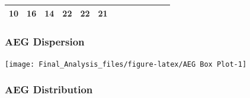 \begin{longtable}[]{@{}lcccccccccccc@{}}
\begin{minipage}[t]{0.04\columnwidth}
10\strut
\end{minipage} & \begin{minipage}[t]{0.04\columnwidth}\centering\strut
16\strut
\end{minipage} & \begin{minipage}[t]{0.04\columnwidth}\centering\strut
14\strut
\end{minipage} & \begin{minipage}[t]{0.04\columnwidth}\centering\strut
22\strut
\end{minipage} & \begin{minipage}[t]{0.04\columnwidth}\centering\strut
22\strut
\end{minipage} & \begin{minipage}[t]{0.04\columnwidth}\centering\strut
21\strut
\end{minipage}\tabularnewline
\bottomrule
\end{longtable}

\subsubsection{AEG Dispersion}\label{aeg-dispersion}

\begin{Shaded}
\begin{Highlighting}[]
\NormalTok{(AEG[,}\NormalTok{:}\NormalTok{], }\NormalTok{(}\NormalTok{), }\NormalTok{)}
\end{Highlighting}
\end{Shaded}

\begin{center}\texttt{[image: Final\_Analysis\_files/figure-latex/AEG Box Plot-1]} \end{center}

\subsubsection{AEG Distribution}\label{aeg-distribution}

\begin{Shaded}
\begin{Highlighting}[]
\NormalTok{(}\NormalTok{(}\NormalTok{,}\NormalTok{))}
\NormalTok{, }\NormalTok{, } \NormalTok{(}\NormalTok{, }\NormalTok{))}
\NormalTok{, }\NormalTok{, } \NormalTok{(}\NormalTok{, }\NormalTok{))}
\end{Highlighting}
\end{Shaded}

